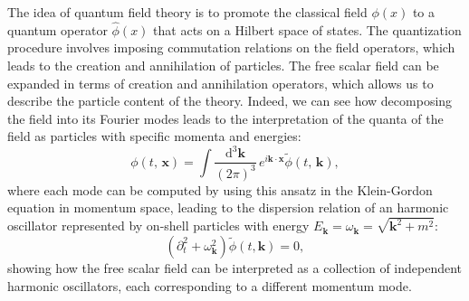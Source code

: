 The idea of quantum field theory is to promote the classical field \(\phi(x)\) to a quantum operator \(\hat{\phi}(x)\) that acts on a Hilbert space of states. The quantization procedure involves imposing commutation relations on the field operators, which leads to the creation and annihilation of particles. The free scalar field can be expanded in terms of creation and annihilation operators, which allows us to describe the particle content of the theory. Indeed, we can see how decomposing the field into its Fourier modes leads to the interpretation of the quanta of the field as particles with specific momenta and energies:
\[
    \phi(t,\, \mathbf{x}) = \int \frac{\mathrm{d}^3 \mathbf{k}}{(2\pi)^3} \, e^{i \mathbf{k} \cdot \mathbf{x}} \tilde{\phi}(t,\,\mathbf{k}),
\]
where each mode can be computed by using this ansatz in the Klein-Gordon equation in momentum space, leading to the dispersion relation of an harmonic oscillator represented by on-shell particles with energy \(E_{\mathbf{k}} = \omega_{\mathbf{k}} = \sqrt{\mathbf{k}^2 + m^2}\):
\[
    \left( \partial_t^2 + \omega_{\mathbf{k}}^2 \right) \tilde{\phi}(t, \mathbf{k}) = 0,
\]
showing how the free scalar field can be interpreted as a collection of independent harmonic oscillators, each corresponding to a different momentum mode.

